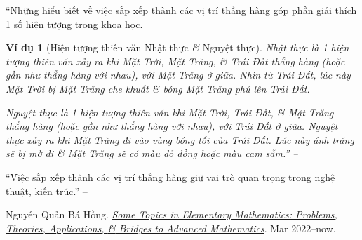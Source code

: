 \documentclass{article}
\numberwithin{equation}{section}
\newtheorem{example}{Ví dụ}[section]
\begin{document}
``Những hiểu biết về việc sắp xếp thành các vị trí thẳng hàng góp phần giải thích 1 số hiện tượng trong khoa học.

\begin{example}[Hiện tượng thiên văn Nhật thực \textit{\&} Nguyệt thực]
	\emph{Nhật thực} là 1 hiện tượng thiên văn xảy ra khi Mặt Trời, Mặt Trăng, \textit{\&} Trái Đất thẳng hàng (hoặc gần như thẳng hàng với nhau), với Mặt Trăng ở giữa. Nhìn từ Trái Đất, lúc này Mặt Trời bị Mặt Trăng che khuất \textit{\&} bóng Mặt Trăng phủ lên Trái Đất.
	
	\emph{Nguyệt thực} là 1 hiện tượng thiên văn khi Mặt Trời, Trái Đất, \textit{\&} Mặt Trăng thẳng hàng (hoặc gần như thẳng hàng với nhau), với Trái Đất ở giữa. Nguyệt thực xảy ra khi Mặt Trăng đi vào vùng bóng tối của Trái Đất. Lúc này ánh trăng sẽ bị mờ đi \textit{\&} Mặt Trăng sẽ có màu đỏ đồng hoặc màu cam sẫm.'' -- \cite[p. 105]{Thai_Anh_Dat_Ha_Loan_Nam_Quang_Toan_6_tap_2}
\end{example}
``Việc sắp xếp thành các vị trí thẳng hàng giữ vai trò quan trọng trong nghệ thuật, kiến trúc.'' -- \cite[p. 106]{Thai_Anh_Dat_Ha_Loan_Nam_Quang_Toan_6_tap_2}


\begin{thebibliography}{99}
	 Nguyễn Quản Bá Hồng. \href{https://github.com/NQBH/hobby/blob/master/elementary_math/NQBH_elementary_math.pdf}{\textit{Some Topics in Elementary Mathematics: Problems, Theories, Applications, \textit{\&} Bridges to Advanced Mathematics}}. Mar 2022--now.
\end{thebibliography}


\printbibliography[heading=bibintoc]
	
\end{document}
